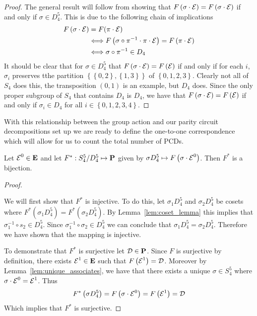\begin{proof}

The general result will follow from showing that $F\left( \sigma \cdot \operatorname{\mathcal{E}} \right) = F\left(\sigma \cdot \operatorname{\mathcal{E}}\right)$ if and only if $\sigma \in D_{4}^5$. This is due to the following chain of implications
\begin{align*}
  F\left(\sigma \cdot \operatorname{\mathcal{E}}\right) &=  F(\pi \cdot \operatorname{\mathcal{E}})  \\
  &\Longleftrightarrow   F\left(\sigma \circ \pi^{-1} \cdot \pi \cdot \operatorname{\mathcal{E}}\right) = F\left(\pi \cdot \operatorname{\mathcal{E}}  \right)    \\
  &\Longleftrightarrow \sigma \circ \pi^{-1} \in D_4
\end{align*}
It should be clear that for $\sigma \in D_{4}^5$ that $F\left(\sigma \cdot \operatorname{\mathcal{E}} \right) = F\left(\operatorname{\mathcal{E}} \right)$ if and only if for each $i$, $\sigma_i$ preserves tthe partition $\left\{ \left\{0,2\right\}, \left\{1,3 \right\} \right\}$ of $\left\{0,1,2,3 \right\}$. Clearly not all of $S_4$ does this, the transposition $\left(0,1\right)$ is an example, but $D_4$ does. Since the only proper subgroup of $S_4$ that contains $D_4$ is $D_4$, we have that $F\left(\sigma \cdot \operatorname{\mathcal{E}} \right) = F\left(\operatorname{\mathcal{E}} \right)$ if and only if $\sigma_i \in D_4$ for all $i \in \left\{0,1,2,3,4\right\}$. 
\end{proof}

With this relationship between the group action and our parity circuit decompositions set up we are ready to define the one-to-one correspondence which will allow for us to count the total number of PCDs. 

\begin{theorem}
  \label{thm:cosets_bijection}
Let $\operatorname{\mathcal{E}}^{0} \in \operatorname{\mathbf{E}}$ and let $F^{*}:S_{4}^5 / D_{4}^5 \mapsto \operatorname{\mathbf{P}}$ given by $\sigma D_{4}^5 \mapsto F\left( \sigma \cdot \operatorname{\mathcal{E}}^{0}\right)$. Then $F^{*}$ is a bijection.  
\end{theorem}

\begin{proof}
\label{pf:cosets_bijection}

We will first show that $F^{*}$ is injective. To do this, let $\sigma_1 D_{4}^5$ and $\sigma_2 D_{4}^5$ be cosets where $F^{*}(\sigma_1 D_{4}^5  ) = F^{*}(\sigma_2 D_{4}^5 )$. By Lemma~\ref{lem:coset_lemma} this implies that $\sigma_1^{-1} \circ s_2 \in D_{4}^5$. Since $\sigma_{1}^{-1}\circ \sigma_{2} \in D_{4}^5$ we can conclude that $\sigma_1  D_{4}^5 = \sigma_2 D_{4}^5$. Therefore we have shown that the mapping is injective.

To demonstrate that $F^{*}$ is surjective let $\operatorname{\mathcal{D}} \in \operatorname{\mathbf{P}}$. Since $F$ is surjective by definition, there exists $\operatorname{\mathcal{E}}^{1} \in \operatorname{\mathbf{E}}$ such that $F\left(\operatorname{\mathcal{E}}^{1}\right) = \operatorname{\mathcal{D}}$. Moreover by Lemma~\ref{lem:unique_associates}, we have that there exists a unique $\sigma \in S_{4}^5$ where $\sigma \cdot \operatorname{\mathcal{E}}^0 = \operatorname{\mathcal{E}}^1$. Thus\[  F^{*}\left( \sigma D_{4}^5 \right) = F\left( \sigma \cdot \operatorname{\mathcal{E}}^{0} \right) = F\left(\operatorname{\mathcal{E}}^{1} \right) = \operatorname{\mathcal{D}} \] Which implies that $F^{*}$ is surjective.
\end{proof}


